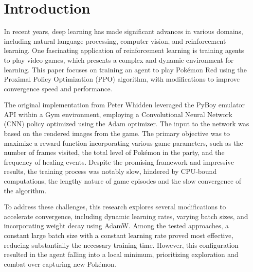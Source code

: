 \documentclass[10pt,conference]{IEEEtran}
\begin{document}
\maketitle






\IEEEpeerreviewmaketitle



\section{Introduction}

In recent years, deep learning has made significant advances in various domains, including natural language processing, computer vision, and reinforcement learning. One fascinating application of reinforcement learning is training agents to play video games, which presents a complex and dynamic environment for learning. This paper focuses on training an agent to play Pokémon Red using the Proximal Policy Optimization (PPO) algorithm, with modifications to improve convergence speed and performance.

The original implementation from Peter Whidden \cite{ref:whidden} leveraged the PyBoy emulator API within a Gym environment, employing a Convolutional Neural Network (CNN) policy optimized using the Adam optimizer. The input to the network was based on the rendered images from the game. The primary objective was to maximize a reward function incorporating various game parameters, such as the number of frames visited, the total level of Pokémon in the party, and the frequency of healing events. Despite the promising framework and impressive results, the training process was notably slow, hindered by CPU-bound computations, the lengthy nature of game episodes and the slow convergence of the algorithm.

To address these challenges, this research explores several modifications to accelerate convergence, including dynamic learning rates, varying batch sizes, and incorporating weight decay using AdamW. Among the tested approaches, a constant large batch size with a constant learning rate proved most effective, reducing  substantially the necessary training time. However, this configuration resulted in the agent falling into a local minimum, prioritizing exploration and combat over capturing new Pokémon.
\end{document}
